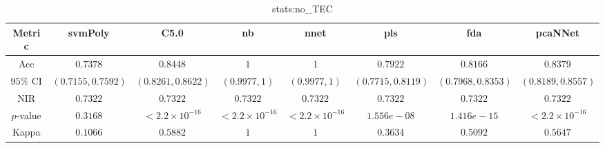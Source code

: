 \begin{table}[!ht]
	\centering
	\begin{tabular}{|c|c|c|c|c|c|c|c|}
		\hline
		Metric & svmPoly & C5.0 & nb & nnet & pls & fda & pcaNNet \\ \hline
		Acc & $0.7378$ & $0.8448$ & $1$ & $1$ & $0.7922$ & $0.8166$ & $0.8379$ \\ \hline
		$95\%$ CI & $(0.7155, 0.7592)$ & $(0.8261, 0.8622)$ & $(0.9977, 1)$ & $(0.9977, 1)$ & $(0.7715, 0.8119)$ & $(0.7968, 0.8353)$ & $(0.8189, 0.8557)$ \\ \hline
		NIR & $0.7322$ & $0.7322$ & $0.7322$ & $0.7322$ & $0.7322$ & $0.7322$ & $0.7322$ \\ \hline
		$p$-value & $0.3168$ & $< 2.2 \times {10}^{-16}$ & $< 2.2 \times {10}^{-16}$ & $< 2.2 \times {10}^{-16}$ & $1.556e-08$ & $1.416e-15$ & $< 2.2 \times {10}^{-16}$ \\ \hline
		Kappa & $0.1066$ & $0.5882$ & $1$ & $1$ & $0.3634$ & $0.5092$ & $0.5647$ \\ \hline
	\end{tabular}
	\caption{stats:no_TEC}
	\label{tab:stats:no_TEC}
\end{table}
